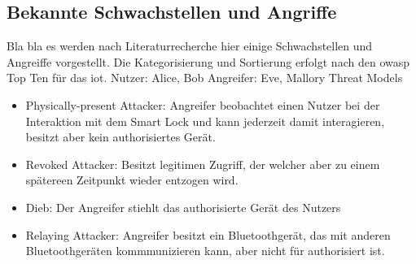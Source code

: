 \subsection{Bekannte Schwachstellen und Angriffe}
\label{sec:analysis_weaknesses}
    Bla bla es werden nach Literaturrecherche hier einige Schwachstellen und Angreiffe vorgestellt. 
    Die Kategorisierung und Sortierung erfolgt nach den \gls{owasp} Top Ten für das \gls{iot}. 
    Nutzer: Alice, Bob
    Angreifer: Eve, Mallory
	Threat Models\cite{Ho2016}
	\begin{itemize}
	    \item Physically-present Attacker: Angreifer beobachtet einen Nutzer bei der Interaktion mit dem Smart Lock und kann jederzeit damit interagieren, besitzt aber kein authorisiertes Gerät.
		\item Revoked Attacker: Besitzt legitimen Zugriff, der welcher aber zu einem spätereen Zeitpunkt wieder entzogen wird.
		\item Dieb: Der Angreifer stiehlt das authorisierte Gerät des Nutzers
		\item Relaying Attacker: Angreifer besitzt ein Bluetoothgerät, das mit anderen Bluetoothgeräten kommmunizieren kann, aber nicht für authorisiert ist.
	\end{itemize}
    
